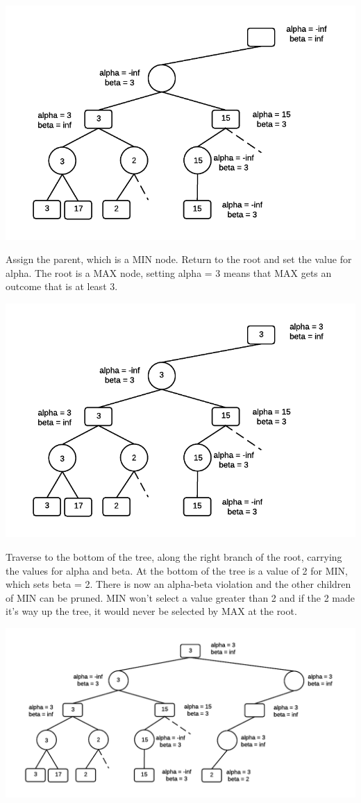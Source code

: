 \documentclass[11pt]{article}
\makeatletter
\def\maxwidth{\ifdim\Gin@nat@width>\linewidth\linewidth
    \else\Gin@nat@width\fi}
\let\Oldincludegraphics\includegraphics
\renewcommand{\includegraphics}[1]{\Oldincludegraphics[width=.8\maxwidth]{#1}}
\makeatother
\begin{document}
\includegraphics{img/ABExample7.png}

Assign the parent, which is a MIN node. Return to the root and set the
value for alpha. The root is a MAX node, setting alpha = 3 means that
MAX gets an outcome that is at least 3.

\includegraphics{img/ABExample8.png}

Traverse to the bottom of the tree, along the right branch of the root,
carrying the values for alpha and beta. At the bottom of the tree is a
value of 2 for MIN, which sets beta = 2. There is now an alpha-beta
violation and the other children of MIN can be pruned. MIN won't select
a value greater than 2 and if the 2 made it's way up the tree, it would
never be selected by MAX at the root.

\includegraphics{img/ABExample9.png}
\end{document}

